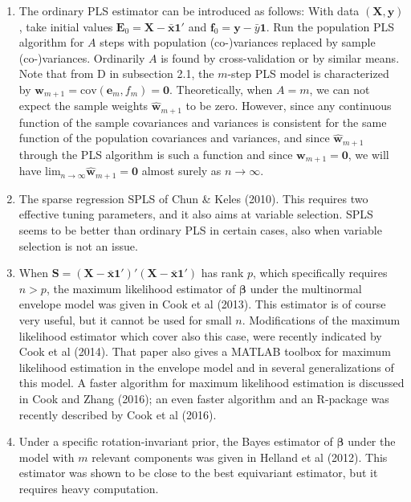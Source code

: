 \documentclass[a4paper, 11pt]{article}
\begin{document}
\begin{enumerate}[label=\alph*.]

\item The ordinary PLS estimator can be introduced as follows: With data $(\bm{X},\bm{y})$, take initial values $\bm{E}_{0}=\bm{X}-\bar{\bm{x}}\bm{1}'$
  and $\bm{f}_{0}=\bm{y}-\bar{y}\bm{1}$. Run the population PLS algorithm for $A$ steps with population (co-)variances replaced by sample (co-)variances.
  Ordinarily $A$ is found by cross-validation or by similar means. Note that from D in subsection 2.1, the $m$-step PLS model is characterized by $\bm{w}_{m+1}=\mathrm{cov}(\bm{e}_m,f_m)=\bm{0}$. Theoretically, when $A=m$, we can not expect the sample weights $\widehat{\bm{w}}_{m+1}$
  to be zero. However, since any continuous function of the sample covariances and variances is consistent for the same function of the
  population covariances and variances, and since  $\widehat{\bm{w}}_{m+1}$ through the PLS algorithm is such a function and since $\bm{w}_{m+1}=\bm{0}$, we will have ${\mathrm{lim}_{n\rightarrow\infty}}\widehat{\bm{w}}_{m+1}=\bm{0}$ almost surely as $n\rightarrow\infty$.
  \smallskip

\item The sparse regression SPLS of Chun \& Keles (2010). This requires two effective tuning parameters, and it also aims at variable selection. SPLS seems to be better than ordinary PLS in certain cases, also when variable selection is not an issue.
  \smallskip

\item When $\bm{S}=(\bm{X}-\bar{\bm{x}}\bm{1}')'(\bm{X}-\bar{\bm{x}}\bm{1}')$ has rank $p$, which specifically requires $n>p$, the maximum likelihood
  estimator of $\bm{\beta}$ under the multinormal envelope model was given in Cook et al (2013). This estimator is of course very useful, but it cannot be used for small $n$. Modifications of the maximum likelihood estimator which cover also this case, were recently indicated by Cook et al (2014). That paper also gives a MATLAB toolbox for maximum likelihood estimation in the envelope model and in several generalizations of this model. A faster algorithm for maximum likelihood estimation is discussed in Cook and Zhang (2016); an even faster algorithm and an R-package was recently described by Cook et al (2016).
  \smallskip

\item Under a specific rotation-invariant prior, the Bayes estimator of $\bm{\beta}$ under the model with $m$ relevant components was given in Helland et al 
  (2012). This estimator was shown to be close to the best equivariant estimator, but it requires heavy computation.
  \smallskip

\end{enumerate}
\end{document}
